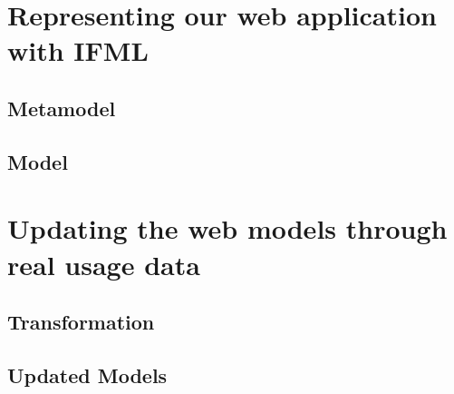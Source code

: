 \section{Representing our web application with IFML}

\subsection{Metamodel}

\subsection{Model}

\section{Updating the web models through real usage data}

\subsection{Transformation}

\subsection{Updated Models}

